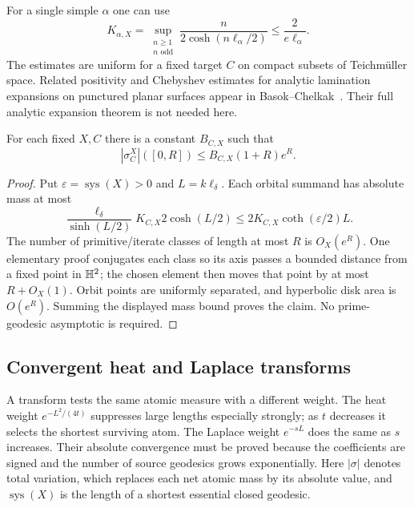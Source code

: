 For a single simple $\alpha$ one can use
\[
 K_{\alpha,X}
 =\sup_{\substack{n\geq1\\n\text{ odd}}}
   \frac{n}{2\cosh(n\ell_\alpha/2)}
 \leq\frac{2}{e\ell_\alpha}.
\]
The estimates are uniform for a fixed target $C$ on compact subsets
of Teichm\"uller space. Related positivity and Chebyshev estimates
for analytic lamination expansions on punctured planar surfaces
appear in Basok--Chelkak~\cite[Section 4.4, Theorems 4.7 and 4.9]{BasokChelkak}. Their
full analytic expansion theorem is not needed here.

\begin{corollary}
\label{cor:coeffmeasuregrowth}
For each fixed $X,C$ there is a constant $B_{C,X}$ such that
\begin{equation}
 |\sigma_C^X|([0,R])\leq B_{C,X}(1+R)e^R.
 \label{eq:coeffmeasuregrowth}
\end{equation}
\end{corollary}

\begin{proof}
Put $\varepsilon=\operatorname{sys}(X)>0$ and
$L=k\ell_\delta$. Each orbital summand has absolute mass at most
\[
 \frac{\ell_\delta}{\sinh(L/2)}
 K_{C,X}2\cosh(L/2)
 \leq2K_{C,X}\coth(\varepsilon/2)L.
\]
The number of primitive/iterate classes of length at most $R$ is
$O_X(e^R)$. One elementary proof conjugates each class so its axis
passes a bounded distance from a fixed point in $\mathbb H^2$; the chosen
element then moves that point by at most $R+O_X(1)$. Orbit points
are uniformly separated, and hyperbolic disk area is $O(e^R)$.
Summing the displayed mass bound proves the claim. No prime-geodesic
asymptotic is required.
\end{proof}

\subsection{Convergent heat and Laplace transforms}

A transform tests the same atomic measure with a different weight.
The heat weight $e^{-L^2/(4t)}$ suppresses large lengths especially
strongly; as $t$ decreases it selects the shortest surviving atom.
The Laplace weight $e^{-sL}$ does the same as $s$ increases.
Their absolute convergence must be proved because the coefficients
are signed and the number of source geodesics grows exponentially.
Here $|\sigma|$ denotes total variation, which replaces each net
atomic mass by its absolute value, and $\operatorname{sys}(X)$ is
the length of a shortest essential closed geodesic.

